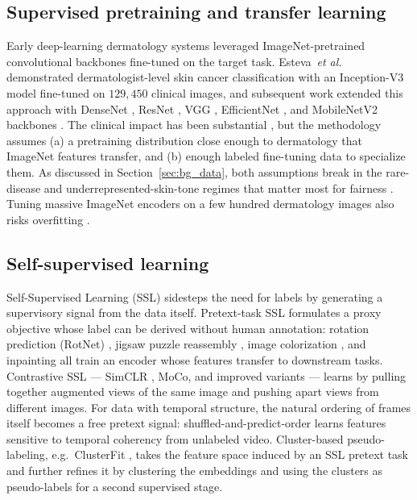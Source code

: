 \documentclass[11pt]{ucthesis}
\newcommand{\etal}{\textit{et al.}\xspace}
\begin{document}
\subsection{Supervised pretraining and transfer learning}

Early deep-learning dermatology systems leveraged ImageNet-pretrained convolutional backbones \cite{deng_2009_imagenet,deng2009imagenet} fine-tuned on the target task. Esteva~\etal \cite{esteva_2017_dermatologistlevel} demonstrated dermatologist-level skin cancer classification with an Inception-V3 model fine-tuned on $129{,}450$ clinical images, and subsequent work extended this approach with DenseNet \cite{huang2017densely,huang_2016_densely}, ResNet \cite{he_2015_deep}, VGG \cite{simonyan_2014_very}, EfficientNet \cite{tan_2019_efficientnet}, and MobileNetV2 \cite{sandler_2018_mobilenetv2} backbones \cite{han_2020_augmented,brinker-2019,liu-2020,winkler-2023}. The clinical impact has been substantial \cite{Esteva2021DeepLM}, but the methodology assumes (a) a pretraining distribution close enough to dermatology that ImageNet features transfer, and (b) enough labeled fine-tuning data to specialize them. As discussed in Section~\ref{sec:bg_data}, both assumptions break in the rare-disease and underrepresented-skin-tone regimes that matter most for fairness \cite{daneshjou_2022_disparities,weng-2020,Moon2022FinetuningDM}. Tuning massive ImageNet encoders on a few hundred dermatology images also risks overfitting \cite{razzak_2017_deep}.

\subsection{Self-supervised learning}

Self-Supervised Learning (SSL) sidesteps the need for labels by generating a supervisory signal from the data itself. Pretext-task SSL formulates a proxy objective whose label can be derived without human annotation: rotation prediction (RotNet) \cite{gidaris2018unsupervised}, jigsaw puzzle reassembly \cite{noroozi2016unsupervised}, image colorization \cite{larsson2016learning,zhang2016colorful}, and inpainting \cite{pathak2016context,ledig2017photo} all train an encoder whose features transfer to downstream tasks. Contrastive SSL --- SimCLR \cite{chen2020simple,chen2020big}, MoCo, and improved variants \cite{chen2020improved} --- learns by pulling together augmented views of the same image and pushing apart views from different images. For data with temporal structure, the natural ordering of frames itself becomes a free pretext signal: shuffled-and-predict-order \cite{misra2016shuffle} learns features sensitive to temporal coherency from unlabeled video. Cluster-based pseudo-labeling, e.g.\ ClusterFit \cite{yan2020clusterfit}, takes the feature space induced by an SSL pretext task and further refines it by clustering the embeddings and using the clusters as pseudo-labels for a second supervised stage.
\end{document}

